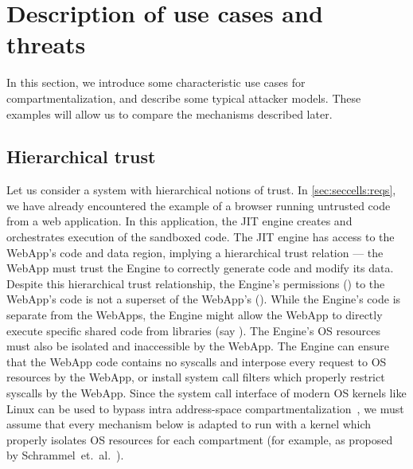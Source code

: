 


\section{Description of use cases and threats}
\label{sec:compreview:usecases}
In this section, we introduce some characteristic use cases for 
compartmentalization, and 
describe some typical attacker models.
These examples will allow us to compare the mechanisms described later.

\subsection{Hierarchical trust} 
\label{sec:compreview:usecases:hierarchical}
Let us consider a system with hierarchical notions of trust.
In \autoref{sec:seccells:reqs}, we have already encountered the example of
a browser running untrusted code from a web application.
In this application, the JIT engine creates and orchestrates execution of
the sandboxed code.
The JIT engine has access to the WebApp's code and data region, implying
a hierarchical trust relation ---
the WebApp must trust the Engine to correctly generate code and modify
its data.
Despite this hierarchical trust relationship, 
the Engine's permissions () to the WebApp's code is not a
superset of the WebApp's ().
While the Engine's code is separate from the WebApps, the Engine might allow
the WebApp to directly execute specific shared code from 
libraries (say ).
The Engine's OS resources must also be isolated and inaccessible by the
WebApp.
The Engine can ensure that the WebApp code contains no syscalls and interpose
every request to OS resources by the WebApp, or install system call filters
which properly restrict syscalls by the WebApp.
Since the system call interface of modern OS kernels like Linux can be used to 
bypass intra address-space compartmentalization~\cite{ConnorMSS20}, we must
assume that every mechanism below is adapted to run with a kernel which
properly isolates OS resources for each compartment (for example, as proposed 
by Schrammel~et.~al.~\cite{schrammel2022jenny}).


